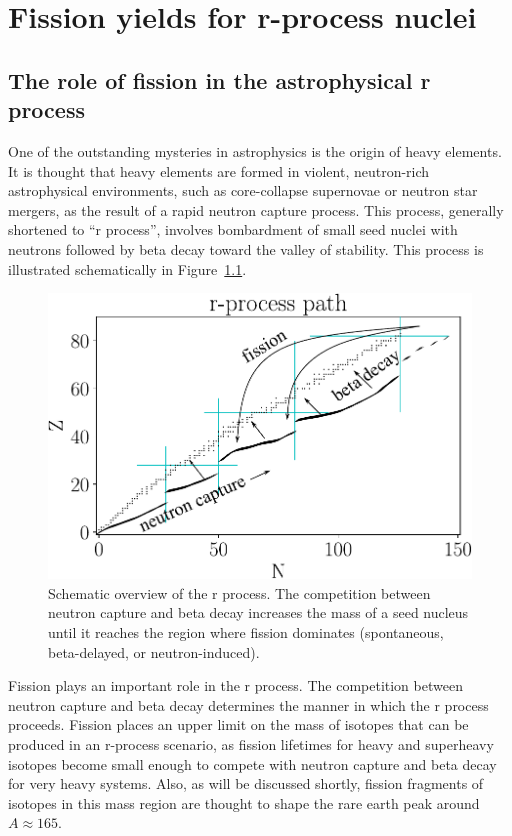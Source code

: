 \chapter{Fission yields for r-process nuclei}\label{chap:rprocess}

\section{The role of fission in the astrophysical r process}
One of the outstanding mysteries in astrophysics is the origin of heavy elements. It is thought that heavy elements are formed in violent, neutron-rich astrophysical environments, such as core-collapse supernovae or neutron star mergers, as the result of a rapid neutron capture process. This process, generally shortened to ``r process'', involves bombardment of small seed nuclei with neutrons followed by beta decay toward the valley of stability.  This process is illustrated schematically in Figure~\ref{fig:rprocpath}.

\begin{figure}
	\centering
	\includegraphics[width=0.8\linewidth]{TeX_files/rProc_path}
	\caption[Schematic overview of the r process. The competition between neutron capture and beta decay increases the mass of a seed nucleus until it reaches the region where fission dominates (spontaneous, beta-delayed, or neutron-induced).]{Schematic overview of the r process. The competition between neutron capture and beta decay increases the mass of a seed nucleus until it reaches the region where fission dominates (spontaneous, beta-delayed, or neutron-induced).}
	\label{fig:rprocpath}
\end{figure}

Fission plays an important role in the r process. The competition between neutron capture and beta decay determines the manner in which the r process proceeds. Fission places an upper limit on the mass of isotopes that can be produced in an r-process scenario, as fission lifetimes for heavy and superheavy isotopes become small enough to compete with neutron capture and beta decay for very heavy systems. Also, as will be discussed shortly, fission fragments of isotopes in this mass region are thought to shape the rare earth peak around $A\approx165$.

